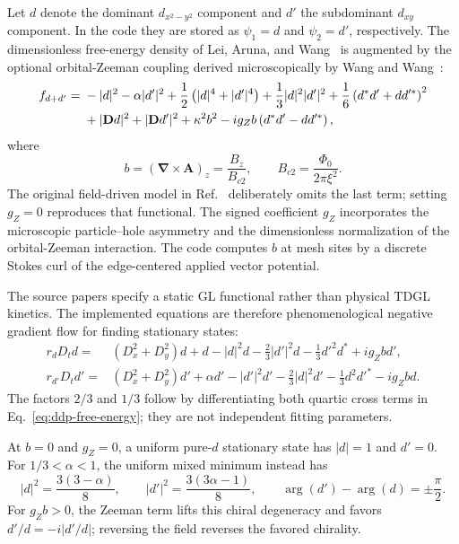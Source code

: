 \documentclass[11pt]{article}
\begin{document}
Let $d$ denote the dominant $d_{x^2-y^2}$ component and $d'$ the
subdominant $d_{xy}$ component.  In the code they are stored as
$\psi_1=d$ and $\psi_2=d'$, respectively.  The dimensionless free-energy
density of Lei, Aruna, and Wang~\cite{Lei2000} is augmented by the optional
orbital-Zeeman coupling derived microscopically by Wang and
Wang~\cite{Wang1999Orbital}:
\begin{align}
    f_{d+d'}={}&-|d|^2-\alpha|d'|^2
      +\frac{1}{2}\left(|d|^4+|d'|^4\right)
      +\frac{1}{3}|d|^2|d'|^2
      +\frac{1}{6}\left(d^*d'+d d'^*\right)^2 \notag\\
      &+|\mathbf Dd|^2+|\mathbf Dd'|^2+\kappa^2b^2
      -i g_Zb\left(d^*d'-d d'^*\right),
    \label{eq:ddp-free-energy}
\end{align}
where
\begin{equation}
    b=(\boldsymbol\nabla\times\mathbf A)_z
      =\frac{B_z}{B_{c2}},
    \qquad B_{c2}=\frac{\Phi_0}{2\pi\xi^2}.
    \label{eq:ddp-field}
\end{equation}
The original field-driven model in Ref.~\cite{Lei2000} deliberately omits the
last term; setting $g_Z=0$ reproduces that functional.  The signed coefficient
$g_Z$ incorporates the microscopic particle--hole asymmetry and the
dimensionless normalization of the orbital-Zeeman interaction.  The code
computes $b$ at mesh sites by a discrete Stokes curl of the edge-centered
applied vector potential.

The source papers specify a static GL functional rather than physical TDGL
kinetics.  The implemented equations are therefore phenomenological negative
gradient flow for finding stationary states:
\begin{align}
    r_dD_td={}&(D_x^2+D_y^2)d+d-|d|^2d
      -\frac{2}{3}|d'|^2d-\frac{1}{3}d'^2d^*
      +i g_Zb d',
    \label{eq:ddp-d}\\
    r_{d'}D_td'={}&(D_x^2+D_y^2)d'+\alpha d'-|d'|^2d'
      -\frac{2}{3}|d|^2d'-\frac{1}{3}d^2d'^*
      -i g_Zb d.
    \label{eq:ddp-dprime}
\end{align}
The factors $2/3$ and $1/3$ follow by differentiating both quartic cross
terms in Eq.~\eqref{eq:ddp-free-energy}; they are not independent fitting
parameters.

At $b=0$ and $g_Z=0$, a uniform pure-$d$ stationary state has
$|d|=1$ and $d'=0$.  For $1/3<\alpha<1$, the uniform mixed minimum instead
has
\begin{equation}
    |d|^2=\frac{3(3-\alpha)}{8},\qquad
    |d'|^2=\frac{3(3\alpha-1)}{8},\qquad
    \arg(d')-\arg(d)=\pm\frac{\pi}{2}.
    \label{eq:ddp-uniform-minimum}
\end{equation}
For $g_Zb>0$, the Zeeman term lifts this chiral degeneracy and favors
$d'/d=-i|d'/d|$; reversing the field reverses the favored chirality.
\end{document}
